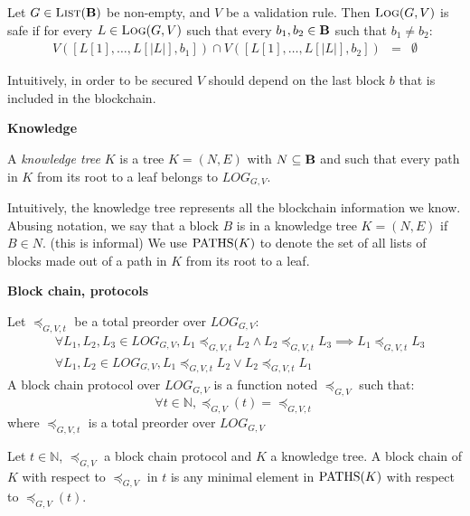 %
%

\begin{mydef}
Let $G \in \text{\sc List}(\text{\bf B})$ be non-empty, and $V$ be a validation rule. Then $\text{\sc Log}(G,V)$ is safe if for every $L \in \text{\sc Log}(G,V)$ such that every $b_1, b_2 \in \text{\bf B}$ such that $b_1 \neq b_2$:
\begin{eqnarray*}
V([L[1], \ldots, L[|L|], b_1]) \cap V([L[1], \ldots, L[|L|], b_2]) & = & \emptyset
\end{eqnarray*}
\end{mydef}
Intuitively, in order to be secured $V$ should depend on the last block $b$ that is included in the blockchain.

\medskip
\noindent
\textbf{Knowledge}

\begin{mydef}
A \emph{knowledge tree} $K$ is a tree $K = (N,E)$ with $N \subseteq \text{\bf B}$ and such that 
every path in $K$ from its root to a leaf belongs to $LOG_{G,V}$.
\end{mydef}

Intuitively, the knowledge tree represents all the blockchain information we know. 
Abusing notation, we say that a block $B$ is in a knowledge tree $K = (N,E)$ if $B \in N$. 
(this is informal) We use $\text{PATHS}(K)$ to denote the set of all lists of blocks made out of a path 
in $K$ from its root to a leaf. 


\medskip
\noindent
\textbf{Block chain, protocols}

\begin{mydef}
	Let $\preceq_{G,V,t}$ be  a total preorder over $LOG_{G,V}$:
\begin{eqnarray*}		
	&\forall L_1, L_2, L_3 \in LOG_{G,V}, L_1 \preceq_{G,V,t} L_2 \land L_2 \preceq_{G,V,t} L_3 \implies L_1 \preceq_{G,V,t} L_3  \\
	&\forall L_1, L_2 \in LOG_{G,V}, L_1 \preceq_{G,V,t} L_2 \lor L_2 \preceq_{G,V,t} L_1 
\end{eqnarray*}
	A block chain protocol over $LOG_{G,V}$ is a function noted $\preceq_{G,V}$ such that: $$ \forall t \in \mathbb{N}, \preceq_{G,V}(t) =  \preceq_{G,V,t}$$ where $\preceq_{G,V,t}$ is a total preorder over $LOG_{G,V}$
\end{mydef}

\begin{mydef}
Let $t \in \mathbb N$, $\preceq_{G,V}$ a block chain protocol and $K$ a knowledge tree. 
A block chain of $K$ with respect to $\preceq_{G,V}$ in $t$ is any minimal element in $\text{PATHS}(K)$ with respect to $\preceq_{G,V}(t)$.
\end{mydef}








